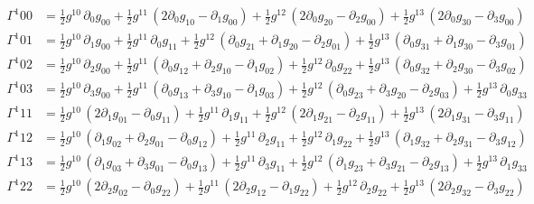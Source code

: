 \documentclass[
]{article}
\begin{document}
\[\begin{aligned}
\Gamma^{1}_{}{00} &= \tfrac{1}{2} g^{10}\, \partial_{0} g_{00} + \tfrac{1}{2} g^{11}\, \left( 2 \partial_{0} g_{10} - \partial_{1} g_{00} \right) + \tfrac{1}{2} g^{12}\, \left( 2 \partial_{0} g_{20} - \partial_{2} g_{00} \right) + \tfrac{1}{2} g^{13}\, \left( 2 \partial_{0} g_{30} - \partial_{3} g_{00} \right) \\
\Gamma^{1}_{}{01} &= \tfrac{1}{2} g^{10}\, \partial_{1} g_{00} + \tfrac{1}{2} g^{11}\, \partial_{0} g_{11} + \tfrac{1}{2} g^{12}\, \left( \partial_{0} g_{21} + \partial_{1} g_{20} - \partial_{2} g_{01} \right) + \tfrac{1}{2} g^{13}\, \left( \partial_{0} g_{31} + \partial_{1} g_{30} - \partial_{3} g_{01} \right) \\
\Gamma^{1}_{}{02} &= \tfrac{1}{2} g^{10}\, \partial_{2} g_{00} + \tfrac{1}{2} g^{11}\, \left( \partial_{0} g_{12} + \partial_{2} g_{10} - \partial_{1} g_{02} \right) + \tfrac{1}{2} g^{12}\, \partial_{0} g_{22} + \tfrac{1}{2} g^{13}\, \left( \partial_{0} g_{32} + \partial_{2} g_{30} - \partial_{3} g_{02} \right) \\
\Gamma^{1}_{}{03} &= \tfrac{1}{2} g^{10}\, \partial_{3} g_{00} + \tfrac{1}{2} g^{11}\, \left( \partial_{0} g_{13} + \partial_{3} g_{10} - \partial_{1} g_{03} \right) + \tfrac{1}{2} g^{12}\, \left( \partial_{0} g_{23} + \partial_{3} g_{20} - \partial_{2} g_{03} \right) + \tfrac{1}{2} g^{13}\, \partial_{0} g_{33} \\
\Gamma^{1}_{}{11} &= \tfrac{1}{2} g^{10}\, \left( 2 \partial_{1} g_{01} - \partial_{0} g_{11} \right) + \tfrac{1}{2} g^{11}\, \partial_{1} g_{11} + \tfrac{1}{2} g^{12}\, \left( 2 \partial_{1} g_{21} - \partial_{2} g_{11} \right) + \tfrac{1}{2} g^{13}\, \left( 2 \partial_{1} g_{31} - \partial_{3} g_{11} \right) \\
\Gamma^{1}_{}{12} &= \tfrac{1}{2} g^{10}\, \left( \partial_{1} g_{02} + \partial_{2} g_{01} - \partial_{0} g_{12} \right) + \tfrac{1}{2} g^{11}\, \partial_{2} g_{11} + \tfrac{1}{2} g^{12}\, \partial_{1} g_{22} + \tfrac{1}{2} g^{13}\, \left( \partial_{1} g_{32} + \partial_{2} g_{31} - \partial_{3} g_{12} \right) \\
\Gamma^{1}_{}{13} &= \tfrac{1}{2} g^{10}\, \left( \partial_{1} g_{03} + \partial_{3} g_{01} - \partial_{0} g_{13} \right) + \tfrac{1}{2} g^{11}\, \partial_{3} g_{11} + \tfrac{1}{2} g^{12}\, \left( \partial_{1} g_{23} + \partial_{3} g_{21} - \partial_{2} g_{13} \right) + \tfrac{1}{2} g^{13}\, \partial_{1} g_{33} \\
\Gamma^{1}_{}{22} &= \tfrac{1}{2} g^{10}\, \left( 2 \partial_{2} g_{02} - \partial_{0} g_{22} \right) + \tfrac{1}{2} g^{11}\, \left( 2 \partial_{2} g_{12} - \partial_{1} g_{22} \right) + \tfrac{1}{2} g^{12}\, \partial_{2} g_{22} + \tfrac{1}{2} g^{13}\, \left( 2 \partial_{2} g_{32} - \partial_{3} g_{22} \right) \\

\end{aligned}\]
\end{document}
